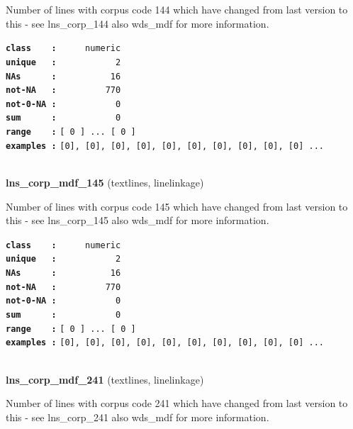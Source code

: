 \documentclass[]{article}
\begin{document}
Number of lines with corpus code 144 which have changed from last
version to this - see lns\_corp\_144 also wds\_mdf for more information.

\textbf{\texttt{class\ \ \ \ :}} \texttt{~~~~~numeric}\\
\textbf{\texttt{unique\ \ \ :}} \texttt{~~~~~~~~~~~2}\\
\textbf{\texttt{NAs\ \ \ \ \ \ :}} \texttt{~~~~~~~~~~16}\\
\textbf{\texttt{not-NA\ \ \ :}} \texttt{~~~~~~~~~770}\\
\textbf{\texttt{not-0-NA\ :}} \texttt{~~~~~~~~~~~0}\\
\textbf{\texttt{sum\ \ \ \ \ \ :}} \texttt{~~~~~~~~~~~0}\\
\textbf{\texttt{range\ \ \ \ :}}
\texttt{{[}\ 0\ {]}\ ...\ {[}\ 0\ {]}}\\
\textbf{\texttt{examples\ :}}
\texttt{{[}0{]},\ {[}0{]},\ {[}0{]},\ {[}0{]},\ {[}0{]},\ {[}0{]},\ {[}0{]},\ {[}0{]},\ {[}0{]},\ {[}0{]}\ ...}\\

~

\textbf{lns\_corp\_mdf\_145} (textlines, linelinkage)

Number of lines with corpus code 145 which have changed from last
version to this - see lns\_corp\_145 also wds\_mdf for more information.

\textbf{\texttt{class\ \ \ \ :}} \texttt{~~~~~numeric}\\
\textbf{\texttt{unique\ \ \ :}} \texttt{~~~~~~~~~~~2}\\
\textbf{\texttt{NAs\ \ \ \ \ \ :}} \texttt{~~~~~~~~~~16}\\
\textbf{\texttt{not-NA\ \ \ :}} \texttt{~~~~~~~~~770}\\
\textbf{\texttt{not-0-NA\ :}} \texttt{~~~~~~~~~~~0}\\
\textbf{\texttt{sum\ \ \ \ \ \ :}} \texttt{~~~~~~~~~~~0}\\
\textbf{\texttt{range\ \ \ \ :}}
\texttt{{[}\ 0\ {]}\ ...\ {[}\ 0\ {]}}\\
\textbf{\texttt{examples\ :}}
\texttt{{[}0{]},\ {[}0{]},\ {[}0{]},\ {[}0{]},\ {[}0{]},\ {[}0{]},\ {[}0{]},\ {[}0{]},\ {[}0{]},\ {[}0{]}\ ...}\\

~

\textbf{lns\_corp\_mdf\_241} (textlines, linelinkage)

Number of lines with corpus code 241 which have changed from last
version to this - see lns\_corp\_241 also wds\_mdf for more information.
\end{document}
